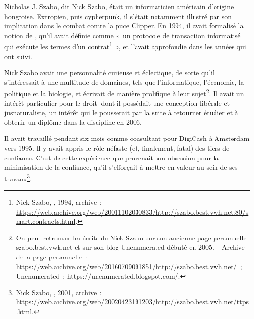Nicholas J. Szabo, dit Nick Szabo, était un informaticien américain d'origine hongroise. Extropien, puis cypherpunk, il s'était notamment illustré par son implication dans le combat contre la puce Clipper. En 1994, il avait formalisé la notion de , qu'il avait définie comme «~un protocole de transaction informatisé qui exécute les termes d'un contrat\footnote{Nick Szabo, , 1994, archive~: \url{https://web.archive.org/web/20011102030833/http://szabo.best.vwh.net:80/smart.contracts.html}.}~», et l'avait approfondie dans les années qui ont suivi.  %

Nick Szabo avait une personnalité curieuse et éclectique, de sorte qu'il s'intéressait à une multitude de domaines, tels que l'informatique, l'économie, la politique et la biologie, et écrivait de manière prolifique à leur sujet\footnote{On peut retrouver les écrits de Nick Szabo sur son ancienne page personnelle szabo.best.vwh.net et sur son blog Unenumerated débuté en 2005. -- Archive de la page personnelle~: \url{https://web.archive.org/web/20160709091851/http://szabo.best.vwh.net/}~; Unenumerated~: \url{https://unenumerated.blogspot.com/}.}. Il avait un intérêt particulier pour le droit, dont il possédait une conception libérale et jusnaturaliste, un intérêt qui le pousserait par la suite à retourner étudier et à obtenir un diplôme dans la discipline en 2006.

Il avait travaillé pendant six mois comme consultant pour DigiCash à Amsterdam vers 1995. Il y avait appris le rôle néfaste (et, finalement, fatal) des tiers de confiance. C'est de cette expérience que provenait son obsession pour la minimisation de la confiance, qu'il s'efforçait à mettre en valeur au sein de ses travaux\footnote{Nick Szabo, , 2001, archive~: \url{https://web.archive.org/web/20020423191203/http://szabo.best.vwh.net/ttps.html}.}.

